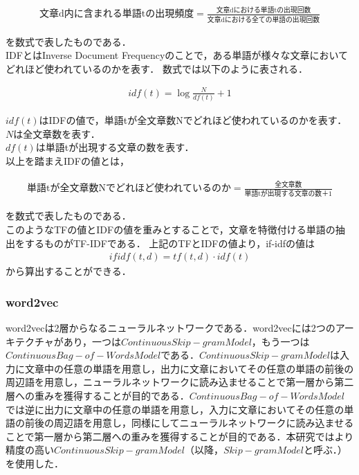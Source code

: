 \begin{align}
\mbox{文章d内に含まれる単語tの出現頻度} = \frac{\mbox{文章dにおける単語tの出現回数}}{\mbox{文章dにおける全ての単語の出現回数}} \nonumber
\end{align}

を数式で表したものである．\\
IDFとはInverse Document Frequencyのことで，ある単語が様々な文章においてどれほど使われているのかを表す．
数式では以下のように表される．

\begin{align}
idf(t) = \log{\frac{N}{df(t)}+1} \nonumber
\end{align}

$ idf(t) $はIDFの値で，単語tが全文章数Nでどれほど使われているのかを表す．\\
$ N $は全文章数を表す．\\
$ df(t) $は単語tが出現する文章の数を表す．\\
以上を踏まえIDFの値とは，

\begin{align}
\mbox{単語tが全文章数Nでどれほど使われているのか} = \frac{\mbox{全文章数}}{\mbox{単語tが出現する文章の数}＋1} \nonumber
\end{align}

を数式で表したものである．\\
このようなTFの値とIDFの値を重みとすることで，文章を特徴付ける単語の抽出をするものがTF-IDFである．
上記のTFとIDFの値より，if-idfの値は
\begin{align}
ifidf(t,d) = tf(t,d) \cdot idf(t) \nonumber
\end{align}
から算出することができる．

\subsubsection{word2vec}
\label{tech:word2vec}
word2vecは2層からなるニューラルネットワークである．word2vecには2つのアーキテクチャがあり，一つは$ Continuous Skip-gram Model $，もう一つは$ Continuous Bag-of-Words Model $である．$ Continuous Skip-gram Model $は入力に文章中の任意の単語を用意し，出力に文章においてその任意の単語の前後の周辺語を用意し，ニューラルネットワークに読み込ませることで第一層から第二層への重みを獲得することが目的である．$ Continuous Bag-of-Words Model $では逆に出力に文章中の任意の単語を用意し，入力に文章においてその任意の単語の前後の周辺語を用意し，同様にしてニューラルネットワークに読み込ませることで第一層から第二層への重みを獲得することが目的である．本研究ではより精度の高い$ Continuous Skip-gram Model $（以降，$ Skip-gram Model $と呼ぶ．）を使用した．\cite{word2vecpaper}

